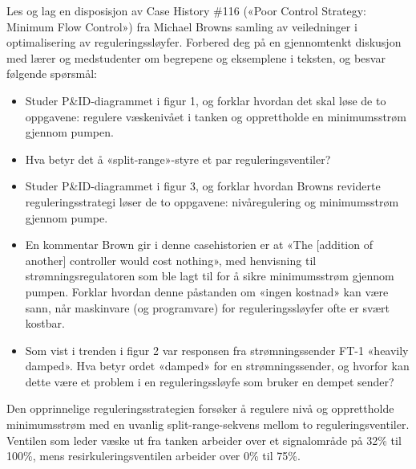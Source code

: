 
Les og lag en disposisjon av Case History \#116 («Poor Control Strategy: Minimum Flow Control») fra Michael Browns samling av veiledninger i optimalisering av reguleringssløyfer. Forbered deg på en gjennomtenkt diskusjon med lærer og medstudenter om begrepene og eksemplene i teksten, og besvar følgende spørsmål:

\begin{itemize}
\item{} Studer P\&ID-diagrammet i figur 1, og forklar hvordan det skal løse de to oppgavene: regulere væskenivået i tanken og opprettholde en minimumsstrøm gjennom pumpen.
\vskip 10pt
\item{} Hva betyr det å «split-range»-styre et par reguleringsventiler?
\vskip 10pt
\item{} Studer P\&ID-diagrammet i figur 3, og forklar hvordan Browns reviderte reguleringsstrategi løser de to oppgavene: nivåregulering og minimumsstrøm gjennom pumpe.
\vskip 10pt
\item{} En kommentar Brown gir i denne casehistorien er at «The [addition of another] controller would cost nothing», med henvisning til strømningsregulatoren som ble lagt til for å sikre minimumsstrøm gjennom pumpen. Forklar hvordan denne påstanden om «ingen kostnad» kan være sann, når maskinvare (og programvare) for reguleringssløyfer ofte er svært kostbar.
\vskip 10pt
\item{} Som vist i trenden i figur 2 var responsen fra strømningssender FT-1 «heavily damped». Hva betyr ordet «damped» for en strømningssender, og hvorfor kan dette være et problem i en reguleringssløyfe som bruker en dempet sender?
\end{itemize}














Den opprinnelige reguleringsstrategien forsøker å regulere nivå og opprettholde minimumsstrøm med en uvanlig split-range-sekvens mellom to reguleringsventiler. Ventilen som leder væske ut fra tanken arbeider over et signalområde på 32\% til 100\%, mens resirkuleringsventilen arbeider over 0\% til 75\%.


